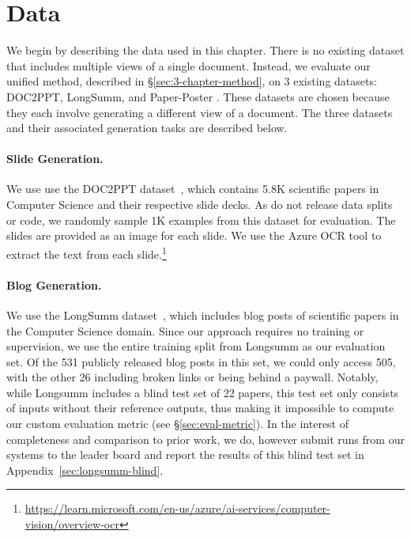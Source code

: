 \section{Data}\label{sec:data}

We begin by describing the data used in this chapter. There is no existing dataset that includes multiple views of a single document. Instead, we evaluate our unified method, described in \S\ref{sec:3-chapter-method}, on 3 existing datasets: DOC2PPT, LongSumm, and Paper-Poster \cite{Fu2021DOC2PPTAP,chandrasekaran2020overview,Qiang2016LearningTG}. These datasets are chosen because they each involve generating a different view of a document. The three datasets and their associated generation tasks are described below.

\paragraph{Slide Generation.} We use use the DOC2PPT dataset~\cite{Fu2021DOC2PPTAP}, which contains 5.8K scientific papers in Computer Science and their respective slide decks. As \textcite{Fu2021DOC2PPTAP} do not release data splits or code, we randomly sample 1K examples from this dataset for evaluation. The slides are provided as an image for each slide. We use the Azure OCR tool to extract the text from each slide.\footnote{\scriptsize \url{https://learn.microsoft.com/en-us/azure/ai-services/computer-vision/overview-ocr}}

\paragraph{Blog Generation.} We use the LongSumm dataset~\cite{chandrasekaran2020overview}, which includes blog posts of scientific papers in the Computer Science domain. Since our approach requires no training or supervision, we use the entire training split from Longsumm as our evaluation set. Of the 531 publicly released blog posts in this set, we could only access 505, with the other 26 including broken links or being behind a paywall. Notably, while Longsumm includes a blind test set of 22 papers, this test set only consists of inputs without their reference outputs, thus making it impossible to compute our custom evaluation metric (see \S\ref{sec:eval-metric}). In the interest of completeness and comparison to prior work, we do, however submit runs from our systems to the leader board and report the results of this blind test set in Appendix~\ref{sec:longsumm-blind}.

